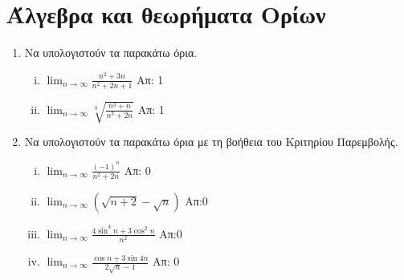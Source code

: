 \section*{Άλγεβρα και θεωρήματα Ορίων}

\begin{enumerate}

  \item Να υπολογιστούν τα παρακάτω όρια.
    \begin{enumerate}[i)]
      \item $ \lim_{n \to \infty} \frac{n^{2}+3n}{n^{2}+2n+1} $ \hfill Απ: 1 
      \item $ \lim_{n \to \infty} \sqrt[3]{\frac{n^{3}+n}{n^{3}+2n}} $ 
        \hfill Απ: 1 
    \end{enumerate}

  \item Να υπολογιστούν τα παρακάτω όρια με τη βοήθεια του Κριτηρίου 
    Παρεμβολής.

    \begin{enumerate}[i)]
      \item $ \lim_{n \to \infty} \frac{(-1)^{n}}{n^{2}+2n}  $ \hfill Απ: 0  
      \item $ \lim_{n \to \infty} (\sqrt{n+2} - \sqrt{n})  $ \hfill Απ:0
      \item $ \lim_{n \to \infty} \frac{4 \sin^{3}{n} + 3 \cos^{2}{n}}{n^{2}} $ 
        \hfill Απ:0
      \item $ \lim_{n \to \infty} \frac{\cos{n} + 3 \sin{4n}}{ 2
        \sqrt{n} -1} $ \hfill Απ: 0  
    \end{enumerate}
\end{enumerate}




